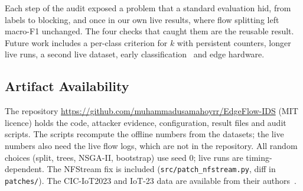 Each step of the audit exposed a problem that a standard evaluation hid, from labels to blocking, and once in our own live results, where flow splitting left macro-F1 unchanged. The four checks that caught them are the reusable result. Future work includes a per-class criterion for $k$ with persistent counters, longer live runs, a second live dataset, early classification~\cite{pekar2025early} and edge hardware.

\subsection{Artifact Availability}

The repository \url{https://github.com/muhammadusamahoyrr/EdgeFlow-IDS} (MIT licence) holds the code, attacker evidence, configuration, result files and audit scripts. The scripts recompute the offline numbers from the datasets; the live numbers also need the live flow logs, which are not in the repository. All random choices (split, trees, NSGA-II, bootstrap) use seed 0; live runs are timing-dependent. The NFStream fix is included (\nolinkurl{src/patch_nfstream.py}, diff in \nolinkurl{patches/}).
The CIC-IoT2023 and IoT-23 data are available from their authors~\cite{neto2023ciciot2023,garcia2020iot23}.
